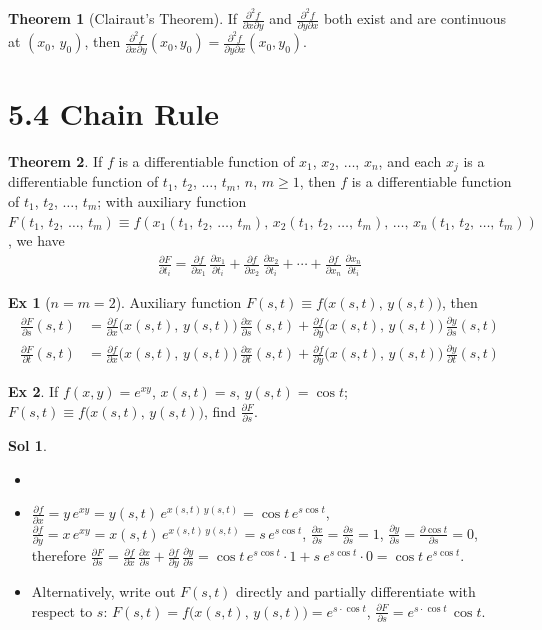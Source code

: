 \documentclass[12pt]{extarticle}
\newcommand{\ds}{\displaystyle}
\theoremstyle{definition}
\newtheorem*{thm}{Theorem}
\newtheorem*{ex}{Ex}
\newtheorem*{sol}{Sol}
\newcommand{\pdiff}[2]{\frac{\partial #1}{\partial #2}}
\begin{document}
\begin{thm}[Clairaut's Theorem]
  If $\ds\frac{\partial^2 f}{\partial x\partial y}$ and $\ds\frac{\partial^2 f}{\partial y\partial x}$ both exist and are continuous at $(x_0,\,y_0)$, then $\ds\frac{\partial^2 f}{\partial x\partial y}(x_0, y_0) = \frac{\partial^2 f}{\partial y\partial x}(x_0, y_0)$. 
\end{thm}

\section*{5.4 Chain Rule} 
\begin{thm}
  If $f$ is a differentiable function of $x_1$, $x_2$, $\ldots$, $x_n$, and each $x_j$ is a differentiable function of $t_1$, $t_2$, $\ldots$, $t_m$, $n$, $m\geqslant 1$, then $f$ is a differentiable function of $t_1$, $t_2$, $\ldots$, $t_m$; with auxiliary function $F(t_1,\,t_2,\,\ldots,\,t_m)\equiv f(x_1(t_1,\,t_2,\,\ldots,\,t_m),\,x_2(t_1,\,t_2,\,\ldots,\,t_m),\,\ldots,\,x_n(t_1,\,t_2,\,\ldots,\,t_m))$, we have
  \begin{align*}
    \pdiff{F}{t_i} = \pdiff{f}{x_1}\,\pdiff{x_1}{t_i} + \pdiff{f}{x_2}\,\pdiff{x_2}{t_i} + \cdots + \pdiff{f}{x_n}\,\pdiff{x_n}{t_i}
  \end{align*}
\end{thm}

\begin{ex}[$n = m = 2$]
  Auxiliary function $\ds F(s, t)\equiv f\big(x(s,t),\,y(s,t)\big)$, then
  \begin{align*}
    \pdiff{F}{s}(s,t) &= \pdiff{f}{x}\big(x(s,t),\,y(s,t)\big)\,\pdiff{x}{s}(s,t) + \pdiff{f}{y}\big(x(s,t),\,y(s,t)\big)\,\pdiff{y}{s}(s,t) \\
    \pdiff{F}{t}(s,t) &= \pdiff{f}{x}\big(x(s,t),\,y(s,t)\big)\,\pdiff{x}{t}(s,t) + \pdiff{f}{y}\big(x(s,t),\,y(s,t)\big)\,\pdiff{y}{t}(s,t)
  \end{align*}
\end{ex}

\begin{ex}
  If $\ds f(x, y) = e^{xy}$, $\ds x(s, t) = s$, $\ds y(s, t) = \cos t$; $\ds F(s, t)\equiv f\big(x(s,t),\,y(s,t)\big)$, find $\ds\pdiff{F}{s}$. 
\end{ex}
\begin{sol}
  \begin{itemize}\setlength{\itemsep}{0pt}
    \item[]
    \item $\ds\pdiff{f}{x} = y\,e^{xy} = y(s,t)\,e^{x(s,t)\,y(s,t)} = \cos t\,e^{s\cos t}$, $\ds\pdiff{f}{y} = x\,e^{xy} = x(s,t)\,e^{x(s,t)\,y(s,t)} = s\,e^{s\cos t}$, $\ds\pdiff{x}{s} = \pdiff{s}{s} = 1$, $\ds\pdiff{y}{s} = \pdiff{\cos t}{s} = 0$, therefore $\ds\pdiff{F}{s} = \pdiff{f}{x}\,\pdiff{x}{s} + \pdiff{f}{y}\,\pdiff{y}{s} = \cos t\,e^{s\cos t}\cdot 1 + s\ e^{s\cos t}\cdot 0 = \cos t\ e^{s\cos t}$. 
    \item Alternatively, write out $F(s, t)$ directly and partially differentiate with respect to $s$: $\ds F(s, t) = f\big(x(s,t),\,y(s,t)\big) = e^{s\cdot\cos t}$, $\ds\pdiff{F}{s} = e^{s\cdot\cos t}\,\cos t$.   
  \end{itemize}
\end{sol}
\end{document}
